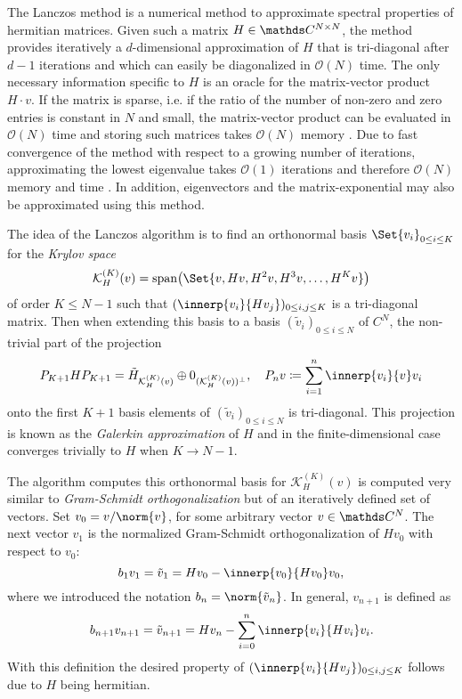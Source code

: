 The Lanczos method is a numerical method to approximate spectral properties of hermitian matrices. 
Given such a matrix \(H \in \C^{N\times N}\), the method provides iteratively a \(d\)-dimensional approximation of \(H\) that is tri-diagonal after \(d-1\) iterations and which can easily be diagonalized in \(\mathcal{O}(N)\) time.
The only necessary information specific to \(H\) is an oracle for the matrix-vector product \(H\cdot v\).
If the matrix is sparse, i.e. if the ratio of the number of non-zero and zero entries is constant in \(N\) and small, the matrix-vector product can be evaluated in \(\mathcal{O}(N)\) time and storing such matrices takes \(\mathcal{O}(N)\) memory \cite{kocherikLanczosMethod2015}. 
Due to fast convergence of the method with respect to a growing number of iterations, approximating the lowest eigenvalue takes \(\mathcal{O}(1)\) iterations and therefore \(\mathcal{O}(N)\) memory and time \cite{kocherikLanczosMethod2015}.
In addition, eigenvectors and the matrix-exponential may also be approximated using this method. 

The idea of the Lanczos algorithm is to find an orthonormal basis \(\Set{v_i}_{0\leq i \leq K}\) for the \emph{Krylov space}
\begin{equation}
    \mathcal{K}^{(K)}_H(v) = \vecspan\of*{\Set{v, Hv, H^2v, H^3v, \dots, H^K v}}
\end{equation}
of order \(K \leq N-1\) such that \((\innerp{v_i}{H v_j})_{0 \leq i,j \leq K}\) is a tri-diagonal matrix. 
Then when extending this basis to a basis \((\tilde v_i)_{0\leq i \leq N}\) of \(C^N\), the non-trivial part of the projection 
\begin{equation}
    P_{K+1} H P_{K+1} = \tilde H_{\mathcal{K}^{(K)}_H(v)} \oplus 0_{(\mathcal{K}^{(K)}_H(v))^\perp}, \quad P_n v \coloneq \sum_{i=1}^n \innerp{v_i}{v} v_i
\end{equation}
onto the first \(K+1\) basis elements of \((\tilde{v}_i)_{0\leq i \leq N}\) is tri-diagonal. 
This projection is known as the \emph{Galerkin approximation} of \(H\) and in the finite-dimensional case converges trivially to \(H\) when \(K \to N-1\).

The algorithm computes this orthonormal basis for \(\mathcal{K}^{(K)}_H(v)\) is computed very similar to \emph{Gram-Schmidt orthogonalization} but of an iteratively defined set of vectors. 
Set \(v_0 = v / \norm{v}\), for some arbitrary vector \(v\in\C^N\). 
The next vector \(v_1\) is the normalized Gram-Schmidt orthogonalization of \(H v_0\) with respect to \(v_0\):
\begin{equation}
    b_1 v_1 = \tilde v_1 = H v_0 - \innerp{v_0}{H v_0} v_0
    ,
\end{equation}
where we introduced the notation \(b_n = \norm{\tilde v_n}\).
In general, \(v_{n+1}\) is defined as 
\begin{equation}
    b_{n+1} v_{n+1} = \tilde v_{n+1} = H v_n - \sum_{i=0}^n \innerp{v_i}{H v_i} v_i
    .
\end{equation}
With this definition the desired property of \((\innerp{v_i}{H v_j})_{0 \leq i,j \leq K}\) follows due to \(H\) being hermitian.

